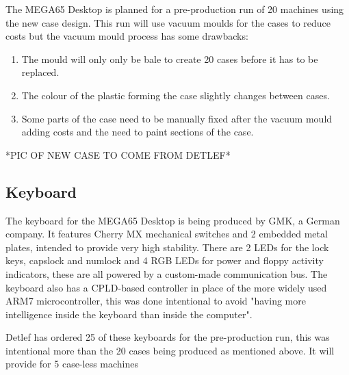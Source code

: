 The MEGA65 Desktop is planned for a pre-production run of 20 machines using the new case design. This run will use vacuum moulds for the cases to reduce costs but the vacuum mould process has some drawbacks: 
\begin{enumerate}
\item The mould will only only be bale to create 20 cases before it has to be replaced.
\item The colour of the plastic forming the case slightly changes between cases.
\item Some parts of the case need to be manually fixed after the vacuum mould adding costs and the need to paint sections of the case.
\end{enumerate}

*PIC OF NEW CASE TO COME FROM DETLEF*

\subsection{Keyboard}
The keyboard for the MEGA65 Desktop is being produced by GMK, a German company. It features Cherry MX mechanical switches and 2 embedded metal plates, intended to provide very high stability. There are 2 LEDs for the lock keys, capslock and numlock and 4 RGB LEDs for power and floppy activity indicators, these are all powered by a custom-made communication bus. The keyboard also has a CPLD-based controller in place of the more widely used ARM7 microcontroller, this was done intentional to avoid "having more intelligence inside the keyboard than inside the computer".

Detlef has ordered 25 of these keyboards for the pre-production run, this was intentional more than the 20 cases being produced as mentioned above. It will provide for 5 case-less machines 